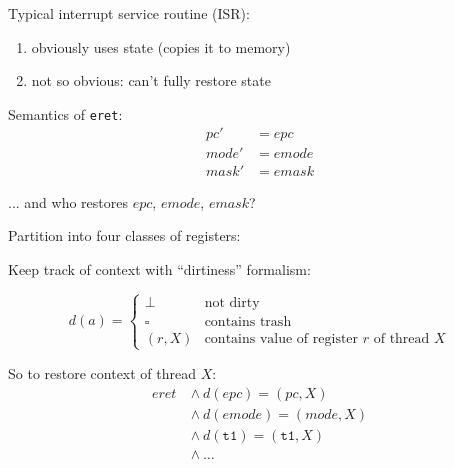 \documentclass{beamer}
\begin{document}
\begin{frame}
Typical interrupt service routine (ISR):

\begin{enumerate} 
	\item obviously uses state (copies it to memory)
	\item not so obvious: can't fully restore state
\end{enumerate} 
\end{frame}

\begin{frame}
Semantics of \texttt{eret}:
\begin{align*}
	pc' &= epc \\
	mode' &= emode \\
	mask' &= emask 
\end{align*} 

... and who restores $epc$, $emode$, $emask$?
\end{frame} 

\begin{frame}
Partition into four classes of registers:

{
{\begin{center} 
\end{center}}
{\begin{center} 
\end{center}}}
{\begin{center} 
\end{center}}
\end{frame} 

\begin{frame} 
Keep track of context with ``dirtiness'' formalism:

\[ d(a) = \begin{cases} \bot & \text{not dirty} \\
	\square & \text{contains trash} \\
	(r,X) & \text{contains value of register $r$ of thread $X$}
 	\end{cases} \]

So to restore context of thread $X$:
\begin{align*}
 eret \ &\land \ d(epc) = (pc,X) \ 
 \\ &\land \ d(emode) = (mode,X) 
 \\
	&\land \ d(\texttt{t1}) = (\texttt{t1},X)
 \\ &\land \ \ldots
\end{align*}
\end{frame} 
\end{document}
